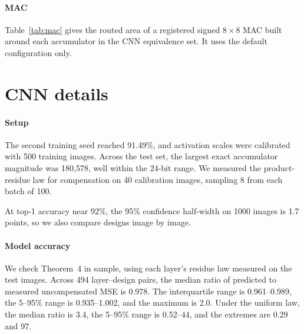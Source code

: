 \documentclass[11pt]{article}
\begin{document}
\paragraph{MAC}
Table~\ref{tab:mac} gives the routed area of a registered signed
$8\times8$ MAC built around each accumulator in the CNN equivalence set.
It uses the default configuration only.

\section{CNN details}

\paragraph{Setup}
The second training seed reached 91.49\%, and activation scales were
calibrated with 500 training images. Across the test set, the largest exact
accumulator magnitude was 180{,}578, well within the 24-bit range. We
measured the product-residue law for compensation on 40 calibration images,
sampling 8 from each batch of 100.

At top-1 accuracy near 92\%, the 95\% confidence half-width on 1000 images
is 1.7 points, so we also compare designs image by image.

\paragraph{Model accuracy}
We check Theorem~4 in sample, using each layer's residue law measured on the
test images. Across 494 layer--design pairs, the median ratio of predicted
to measured uncompensated MSE is 0.978. The interquartile range is
0.961--0.989, the 5--95\% range is 0.935--1.002, and the maximum is 2.0.
Under the uniform law, the median ratio is 3.4, the 5--95\% range is
0.52--44, and the extremes are 0.29 and 97.
\end{document}
